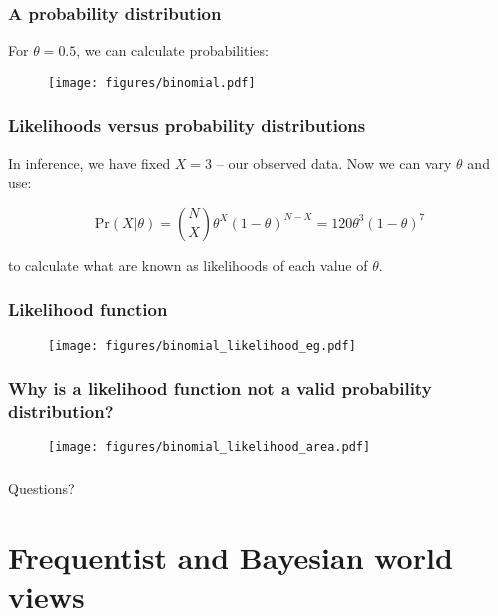 \documentclass{beamer}
\begin{document}
\begin{frame}
	\frametitle{A probability distribution}
	For $\theta=0.5$, we can calculate probabilities:
	
	\begin{figure}[h]
		\centerline{\texttt{[image: figures/binomial.pdf]}}
	\end{figure}

\end{frame}

\begin{frame}
	\frametitle{Likelihoods versus probability distributions}
	In inference, we have fixed $X=3$ -- our observed data. Now we can vary $\theta$ and use:
	
		\begin{equation}
		\text{Pr}(X|\theta) = \binom{N}{X} \theta^X (1- \theta)^{N-X} = 120 \theta^3 (1-\theta)^7
		\end{equation}
		
	to calculate what are known as likelihoods of each value of $\theta$.
	
\end{frame}

\begin{frame}
	\frametitle{Likelihood function}
	
	\begin{figure}[h]
		\centerline{\texttt{[image: figures/binomial\_likelihood\_eg.pdf]}}
	\end{figure}
	
\end{frame}

\begin{frame}
	\frametitle{Why is a likelihood function not a valid probability distribution?}
	
	\begin{figure}[h]
		\centerline{\texttt{[image: figures/binomial\_likelihood\_area.pdf]}}
	\end{figure}
	
\end{frame}

\begin{frame}
	\frametitle{}
	{\Huge Questions?}
\end{frame}

\section{Frequentist and Bayesian world views}
\frame{\tableofcontents[currentsection]}
\end{document}
